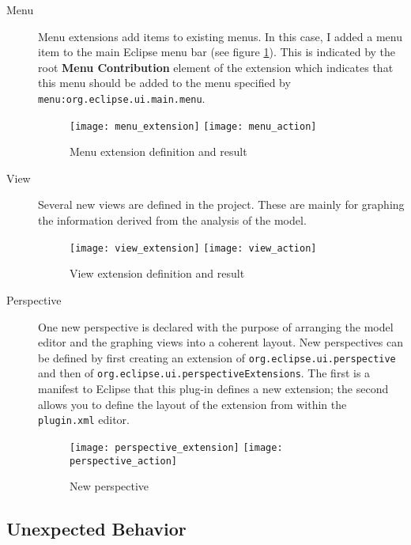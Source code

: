 \begin{description}
    \item[Menu] Menu extensions add items to existing menus. In this case, I added a menu item
    to the main Eclipse menu bar (see figure \ref{fig:menu_extension}). This is indicated by the root \textbf{Menu Contribution} element
    of the extension which indicates that this menu should be added to the menu specified by
    \texttt{menu:org.eclipse.ui.main.menu}.
    \begin{figure}[H]
	\centering
        \texttt{[image: menu\_extension]}
        \texttt{[image: menu\_action]}
        \caption{Menu extension definition and result}
        \label{fig:menu_extension}
    \end{figure}

    \item[View] Several new views are defined in the project. These are mainly for graphing
    the information derived from the analysis of the model.
    \begin{figure}[H]
	\centering
        \texttt{[image: view\_extension]}
        \texttt{[image: view\_action]}
        \caption{View extension definition and result}
        \label{view_extension}
    \end{figure}

    \item[Perspective] One new perspective is declared with the purpose of arranging the model editor and the 
    graphing views into a coherent layout. New perspectives can be defined by first creating an extension of
    \texttt{org.eclipse.ui.perspective} and then of \texttt{org.eclipse.ui.perspectiveExtensions}. The
    first is a manifest to Eclipse that this plug-in defines a new extension; the second allows you
    to define the layout of the extension from within the \texttt{plugin.xml} editor. 
    \begin{figure}[H]
	\centering
	\texttt{[image: perspective\_extension]}
	\texttt{[image: perspective\_action]}
	\caption{New perspective}
    \end{figure}
\end{description}

\subsection{Unexpected Behavior}\label{bad_behavior}


